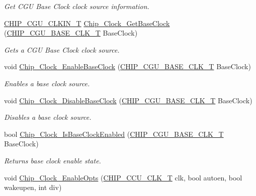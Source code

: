 \begin{DoxyCompactItemize}
\begin{DoxyCompactList}\small\item\em Get C\+GU Base Clock clock source information. \end{DoxyCompactList}\item 
\hyperlink{group___c_l_o_c_k__18_x_x__43_x_x_ga0975326707efebf2b074283e6c602f18}{C\+H\+I\+P\+\_\+\+C\+G\+U\+\_\+\+C\+L\+K\+I\+N\+\_\+T} \hyperlink{group___c_l_o_c_k__18_x_x__43_x_x_ga76a6aba92d67ee2cacf4d53c9f8043ae}{Chip\+\_\+\+Clock\+\_\+\+Get\+Base\+Clock} (\hyperlink{chip__clocks_8h_a31e266dd83cc66eb866d8d051ffd1d45}{C\+H\+I\+P\+\_\+\+C\+G\+U\+\_\+\+B\+A\+S\+E\+\_\+\+C\+L\+K\+\_\+T} Base\+Clock)
\begin{DoxyCompactList}\small\item\em Gets a C\+GU Base Clock clock source. \end{DoxyCompactList}\item 
void \hyperlink{group___c_l_o_c_k__18_x_x__43_x_x_gae957c1a6743ad69320c1c198e5411ec0}{Chip\+\_\+\+Clock\+\_\+\+Enable\+Base\+Clock} (\hyperlink{chip__clocks_8h_a31e266dd83cc66eb866d8d051ffd1d45}{C\+H\+I\+P\+\_\+\+C\+G\+U\+\_\+\+B\+A\+S\+E\+\_\+\+C\+L\+K\+\_\+T} Base\+Clock)
\begin{DoxyCompactList}\small\item\em Enables a base clock source. \end{DoxyCompactList}\item 
void \hyperlink{group___c_l_o_c_k__18_x_x__43_x_x_gaca76aa951b9e6a69a9ef4fb2aea2aaac}{Chip\+\_\+\+Clock\+\_\+\+Disable\+Base\+Clock} (\hyperlink{chip__clocks_8h_a31e266dd83cc66eb866d8d051ffd1d45}{C\+H\+I\+P\+\_\+\+C\+G\+U\+\_\+\+B\+A\+S\+E\+\_\+\+C\+L\+K\+\_\+T} Base\+Clock)
\begin{DoxyCompactList}\small\item\em Disables a base clock source. \end{DoxyCompactList}\item 
bool \hyperlink{group___c_l_o_c_k__18_x_x__43_x_x_ga265d89b2296192ba7d5d2a63c4edd66e}{Chip\+\_\+\+Clock\+\_\+\+Is\+Base\+Clock\+Enabled} (\hyperlink{chip__clocks_8h_a31e266dd83cc66eb866d8d051ffd1d45}{C\+H\+I\+P\+\_\+\+C\+G\+U\+\_\+\+B\+A\+S\+E\+\_\+\+C\+L\+K\+\_\+T} Base\+Clock)
\begin{DoxyCompactList}\small\item\em Returns base clock enable state. \end{DoxyCompactList}\item 
void \hyperlink{group___c_l_o_c_k__18_x_x__43_x_x_gadfa0a46d347a3174c7f67edbaf3a66f8}{Chip\+\_\+\+Clock\+\_\+\+Enable\+Opts} (\hyperlink{chip__clocks_8h_a45bb23228b9831321626c103ada7c60b}{C\+H\+I\+P\+\_\+\+C\+C\+U\+\_\+\+C\+L\+K\+\_\+T} clk, bool autoen, bool wakeupen, int div)

\end{DoxyCompactItemize}
